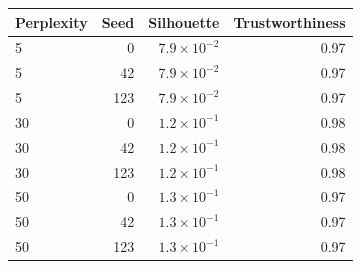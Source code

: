 \begin{tabular}{lrrr}
\toprule
Perplexity & Seed & Silhouette & Trustworthiness \\
\midrule
5 & 0 & $7.9\times10^{-2}$ & 0.97 \\
5 & 42 & $7.9\times10^{-2}$ & 0.97 \\
5 & 123 & $7.9\times10^{-2}$ & 0.97 \\
30 & 0 & $1.2\times10^{-1}$ & 0.98 \\
30 & 42 & $1.2\times10^{-1}$ & 0.98 \\
30 & 123 & $1.2\times10^{-1}$ & 0.98 \\
50 & 0 & $1.3\times10^{-1}$ & 0.97 \\
50 & 42 & $1.3\times10^{-1}$ & 0.97 \\
50 & 123 & $1.3\times10^{-1}$ & 0.97 \\
\bottomrule
\end{tabular}
